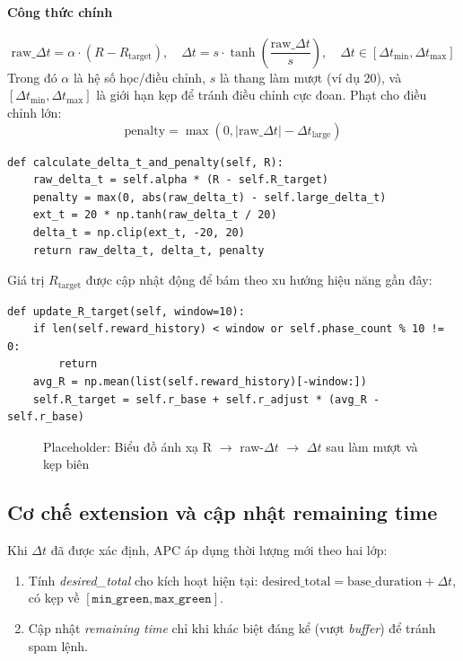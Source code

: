 \documentclass[12pt,a4paper,oneside]{report}
\begin{document}
\paragraph{Công thức chính}
\[
\text{raw\_}\Delta t = \alpha \cdot (R - R_{\text{target}}), \quad
\Delta t = s \cdot \tanh\left(\frac{\text{raw\_}\Delta t}{s}\right), \quad
\Delta t \in [\Delta t_{\min}, \Delta t_{\max}]
\]
Trong đó \(\alpha\) là hệ số học/điều chỉnh, \(s\) là thang làm mượt (ví dụ 20), và \([\Delta t_{\min}, \Delta t_{\max}]\) là giới hạn kẹp để tránh điều chỉnh cực đoan. Phạt cho điều chỉnh lớn:
\[
\text{penalty} = \max \left(0, \left| \text{raw\_}\Delta t \right| - \Delta t_{\text{large}} \right)
\]

\begin{lstlisting}[style=py, caption={Trích đoạn: Tính delta-t và penalty}, label={lst:delta_t}]
def calculate_delta_t_and_penalty(self, R):
    raw_delta_t = self.alpha * (R - self.R_target)
    penalty = max(0, abs(raw_delta_t) - self.large_delta_t)
    ext_t = 20 * np.tanh(raw_delta_t / 20)
    delta_t = np.clip(ext_t, -20, 20)
    return raw_delta_t, delta_t, penalty
\end{lstlisting}

Giá trị \(R_{\text{target}}\) được cập nhật động để bám theo xu hướng hiệu năng gần đây:
\begin{lstlisting}[style=py, caption={Cập nhật R_target động}]
def update_R_target(self, window=10):
    if len(self.reward_history) < window or self.phase_count % 10 != 0:
        return
    avg_R = np.mean(list(self.reward_history)[-window:])
    self.R_target = self.r_base + self.r_adjust * (avg_R - self.r_base)
\end{lstlisting}

\begin{figure}[H]
    \centering
    \fbox{\rule[0pt]{0pt}{0.35\textwidth}\rule[0.8\textwidth]{0pt}{0pt}}
    \caption{Placeholder: Biểu đồ ánh xạ R $\rightarrow$ raw-$\Delta t$ $\rightarrow$ $\Delta t$ sau làm mượt và kẹp biên}
    \label{fig:delta_t_mapping}
\end{figure}

\subsection{Cơ chế extension và cập nhật remaining time}

Khi \(\Delta t\) đã được xác định, APC áp dụng thời lượng mới theo hai lớp:
\begin{enumerate}
    \item Tính \emph{desired\_total} cho kích hoạt hiện tại: \(\text{desired\_total} = \text{base\_duration} + \Delta t\), có kẹp về \([\texttt{min\_green}, \texttt{max\_green}]\).
    \item Cập nhật \emph{remaining time} chỉ khi khác biệt đáng kể (vượt \emph{buffer}) để tránh spam lệnh.
\end{enumerate}
\end{document}
